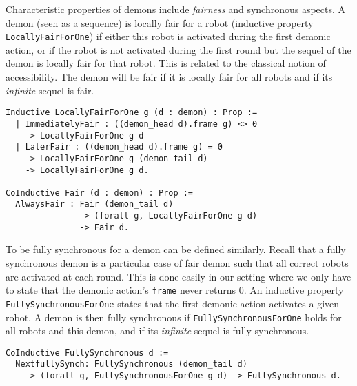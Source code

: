 \documentclass[11pt,a4]{llncs}
\begin{document}
Characteristic properties of demons include \emph{fairness} and
synchronous aspects.
A demon (seen as a sequence) is locally fair for a robot (inductive property
\lstinline!LocallyFairForOne!) if either this robot is activated
during the first demonic action, or if the robot is not activated
during the first round but the sequel of the demon is locally fair for
that robot. This is related to the classical notion of accessibility.
The demon will be fair if it is locally fair for all robots and if its
\emph{infinite} sequel is fair. 

\begin{lstlisting}
Inductive LocallyFairForOne g (d : demon) : Prop :=
  | ImmediatelyFair : ((demon_head d).frame g) <> 0 
    -> LocallyFairForOne g d
  | LaterFair : ((demon_head d).frame g) = 0  
    -> LocallyFairForOne g (demon_tail d)
    -> LocallyFairForOne g d.

CoInductive Fair (d : demon) : Prop :=
  AlwaysFair : Fair (demon_tail d) 
               -> (forall g, LocallyFairForOne g d) 
               -> Fair d.
\end{lstlisting}


To be fully synchronous\label{page:formal_fsync} for a demon can be defined similarly.  Recall
that a fully synchronous demon is a particular case of fair demon such
that all correct robots are activated at each round. This is done
easily in our setting where we only have to state that the demonic
action's \lstinline!frame! never returns $0$.
An inductive property \lstinline!FullySynchronousForOne! states that
the first demonic action activates a given robot.
A demon is then fully synchronous if
\lstinline!FullySynchronousForOne! holds for all robots and this
demon, and if its \emph{infinite} sequel is fully
synchronous.
\begin{lstlisting}
CoInductive FullySynchronous d :=
  NextfullySynch: FullySynchronous (demon_tail d) 
    -> (forall g, FullySynchronousForOne g d) -> FullySynchronous d.
\end{lstlisting}
\end{document}
